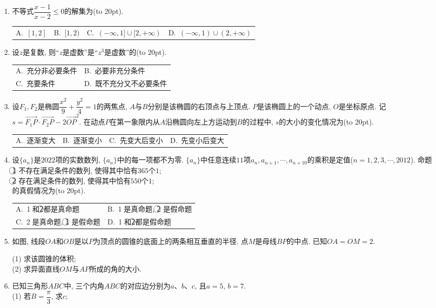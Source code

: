 \documentclass[10pt,a4paper]{article}
\newcommand{\bracket}[1]{(\hbox to #1pt{})}
\newcommand{\twoch}[4]{\par\begin{tabular}{p{.46\textwidth}p{.46\textwidth}}
A.~#1& B.~#2\\
C.~#3& D.~#4
\end{tabular}}
\newcommand{\fourch}[4]{\par\begin{tabular}{p{.23\textwidth}p{.23\textwidth}p{.23\textwidth}p{.23\textwidth}}
A.~#1 &B.~#2& C.~#3& D.~#4
\end{tabular}}
\begin{document}
\begin{enumerate}[1.]
\item 不等式$\dfrac{x-1}{x-2}\le 0$的解集为\bracket{20}.
\fourch{$[1,2]$}{$[1,2)$}{$(-\infty,1]\cup [2,+\infty)$}{$(-\infty,1)\cup (2,+\infty)$}
\item 设$z$是复数, 则``$z$是虚数''是``$z^3$是虚数''的\bracket{20}.
\twoch{充分非必要条件}{必要非充分条件}{充要条件}{既不充分又不必要条件}
\item 设$F_1,F_2$是椭圆$\dfrac{x^2}9+\dfrac{y^2}4=1$的两焦点, $A$与$B$分别是该椭圆的右顶点与上顶点. $P$是该椭圆上的一个动点, $O$是坐标原点. 记$s=\overrightarrow{F_1P}\cdot \overrightarrow{F_2P}-2\overrightarrow{OP}^2$. 在动点$P$在第一象限内从$A$沿椭圆向左上方运动到$B$的过程中, $s$的大小的变化情况为\bracket{20}.
\fourch{逐渐变大}{逐渐变小}{先变大后变小}{先变小后变大}
\item 设$\{a_n\}$是$2022$项的实数数列, $\{a_n\}$中的每一项都不为零. $\{a_n\}$中任意连续$11$项$a_n,a_{n+1},\cdots ,a_{n+10}$的乘积是定值($n=1,2,3,\cdots ,2012$). 命题\\
\textcircled{1} 不存在满足条件的数列, 使得其中恰有$365$个$1$;\\
\textcircled{2} 存在满足条件的数列, 使得其中恰有$550$个$1$;\\
的真假情况为\bracket{20}.
\twoch{\textcircled{1}和\textcircled{2}都是真命题}{\textcircled{1}是真命题, \textcircled{2} 是假命题}{\textcircled{2}是真命题, \textcircled{1} 是假命题}{\textcircled{1}和\textcircled{2}都是假命题}
\item 如图, 线段$OA$和$OB$是以$P$为顶点的圆锥的底面上的两条相互垂直的半径. 点$M$是母线$BP$的中点. 已知$OA=OM=2$.
\begin{center}
\end{center}
(1) 求该圆锥的体积;\\
(2) 求异面直线$OM$与$AP$所成的角的大小.
\item 已知三角形$ABC$中, 三个内角$ABC$的对应边分别为$a$、$b$、$c$, 且$a=5$, $b=7$.\\
(1) 若$B=\dfrac{\pi}3$, 求$c$;\\

\end{enumerate}
\end{document}
